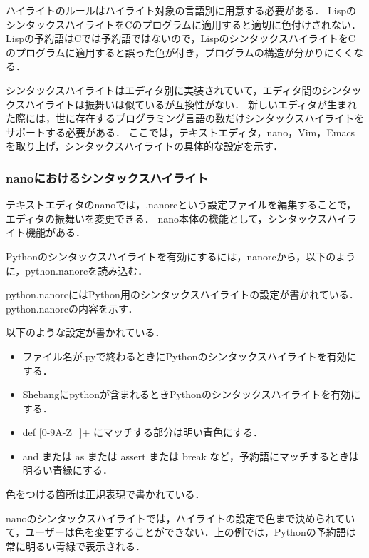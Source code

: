 \documentclass{cs-thesis}
\begin{document}
  ハイライトのルールはハイライト対象の言語別に用意する必要がある．
  LispのシンタックスハイライトをCのプログラムに適用すると適切に色付けされない．
  Lispの予約語はCでは予約語ではないので，LispのシンタックスハイライトをCのプログラムに適用すると誤った色が付き，プログラムの構造が分かりにくくなる．

  シンタックスハイライトはエディタ別に実装されていて，エディタ間のシンタックスハイライトは振舞いは似ているが互換性がない．
  新しいエディタが生まれた際には，世に存在するプログラミング言語の数だけシンタックスハイライトをサポートする必要がある．
  ここでは，テキストエディタ，nano，Vim，Emacsを取り上げ，シンタックスハイライトの具体的な設定を示す．

  \clearpage
  \subsubsection{nanoにおけるシンタックスハイライト}
  テキストエディタのnano\cite{bib:nano}では，.nanorcという設定ファイルを編集することで，エディタの振舞いを変更できる．
  nano本体の機能として，シンタックスハイライト機能がある．

  Pythonのシンタックスハイライトを有効にするには，nanorcから，以下のように，python.nanorcを読み込む．

  

  python.nanorcにはPython用のシンタックスハイライトの設定が書かれている．
  python.nanorcの内容を示す．

  

  以下のような設定が書かれている．

  \begin{itemize}
   \item ファイル名が.pyで終わるときにPythonのシンタックスハイライトを有効にする．
   \item Shebangにpythonが含まれるときPythonのシンタックスハイライトを有効にする．
   \item def [0-9A-Z\_]+ にマッチする部分は明い青色にする．
   \item and または as または assert または break など，予約語にマッチするときは明るい青緑にする．
  \end{itemize}

  色をつける箇所は正規表現で書かれている．

  nanoのシンタックスハイライトでは，ハイライトの設定で色まで決められていて，ユーザーは色を変更することができない．上の例では，Pythonの予約語は常に明るい青緑で表示される．
\end{document}
